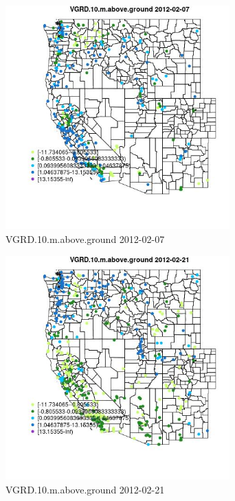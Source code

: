 \begin{figure} 
\centering  
\includegraphics[width=0.77\textwidth]{Code_Outputs/Report_ML_input_PM25_Step4_part_f_de_duplicated_aves_prioritize_24hr_obswNAs_MapObsVGRD10maboveground2012-02-07.jpg} 
\caption{\label{fig:Report_ML_input_PM25_Step4_part_f_de_duplicated_aves_prioritize_24hr_obswNAsMapObsVGRD10maboveground2012-02-07}VGRD.10.m.above.ground 2012-02-07} 
\end{figure} 
 

\clearpage 

\begin{figure} 
\centering  
\includegraphics[width=0.77\textwidth]{Code_Outputs/Report_ML_input_PM25_Step4_part_f_de_duplicated_aves_prioritize_24hr_obswNAs_MapObsVGRD10maboveground2012-02-21.jpg} 
\caption{\label{fig:Report_ML_input_PM25_Step4_part_f_de_duplicated_aves_prioritize_24hr_obswNAsMapObsVGRD10maboveground2012-02-21}VGRD.10.m.above.ground 2012-02-21} 
\end{figure} 
 


